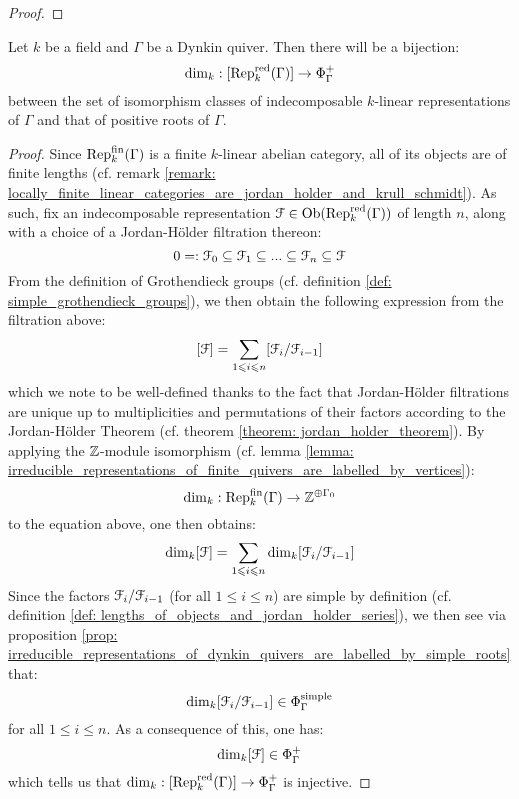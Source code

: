                 \begin{proof}
                    
                \end{proof}
            \begin{theorem} \label{theorem: indecomposable_representations_of_dynkin_quivers_are_labelled_by_positive_roots}
                Let $k$ be a field and $\Gamma$ be a Dynkin quiver. Then there will be a bijection:
                    $$\dim_k: [\mathrm{Rep}_k^{\mathrm{red}}(\Gamma)] \to \Phi_{\Gamma}^+$$
                between the set of isomorphism classes of indecomposable $k$-linear representations of $\Gamma$ and that of positive roots of $\Gamma$.
            \end{theorem}
                \begin{proof}
                    Since $\mathrm{Rep}_k^{\mathrm{fin}}(\Gamma)$ is a finite $k$-linear abelian category, all of its objects are of finite lengths (cf. remark \ref{remark: locally_finite_linear_categories_are_jordan_holder_and_krull_schmidt}). As such, fix an indecomposable representation $\mathcal{F} \in \mathrm{Ob}(\mathrm{Rep}_k^{\mathrm{red}}(\Gamma))$ of length $n$, along with a choice of a Jordan-H\"older filtration thereon:
                        $$0 =: \mathcal{F}_0 \subseteq \mathcal{F}_1 \subseteq ... \subseteq \mathcal{F}_n \subseteq \mathcal{F}$$
                    From the definition of Grothendieck groups (cf. definition \ref{def: simple_grothendieck_groups}), we then obtain the following expression from the filtration above:
                        $$[\mathcal{F}] = \sum_{1 \leqslant i \leqslant n} [\mathcal{F}_i/\mathcal{F}_{i - 1}]$$
                    which we note to be well-defined thanks to the fact that Jordan-H\"older filtrations are unique up to multiplicities and permutations of their factors according to the Jordan-H\"older Theorem (cf. theorem \ref{theorem: jordan_holder_theorem}). By applying the $\mathbb{Z}$-module isomorphism (cf. lemma \ref{lemma: irreducible_representations_of_finite_quivers_are_labelled_by_vertices}):
                        $$\dim_k: \mathrm{Rep}_k^{\mathrm{fin}}(\Gamma) \to \mathbb{Z}^{\oplus \Gamma_0}$$
                    to the equation above, one then obtains:
                        $$\dim_k [\mathcal{F}] = \sum_{1 \leqslant i \leqslant n} \dim_k [\mathcal{F}_i/\mathcal{F}_{i - 1}]$$
                    Since the factors $\mathcal{F}_i/\mathcal{F}_{i - 1}$ (for all $1 \leq i \leq n$) are simple by definition (cf. definition \ref{def: lengths_of_objects_and_jordan_holder_series}), we then see via proposition \ref{prop: irreducible_representations_of_dynkin_quivers_are_labelled_by_simple_roots} that:
                        $$\dim_k [\mathcal{F}_i/\mathcal{F}_{i - 1}] \in \Phi_{\Gamma}^{\mathrm{simple}}$$
                    for all $1 \leq i \leq n$. As a consequence of this, one has:
                        $$\dim_k [\mathcal{F}] \in \Phi_{\Gamma}^+$$
                    which tells us that $\dim_k: [\mathrm{Rep}_k^{\mathrm{red}}(\Gamma)] \to \Phi_{\Gamma}^+$ is injective.
                    

\end{proof}

